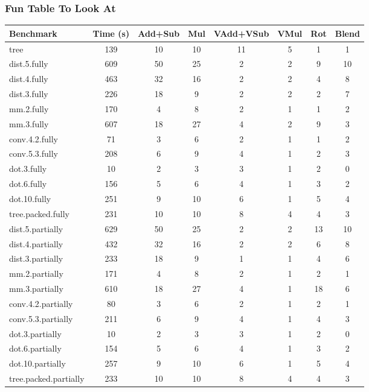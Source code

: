\subsubsection*{Fun Table To Look At}
\begin{table}
    \begin{tabular}{lccccccc}
    \toprule
    Benchmark & Time (s) & Add+Sub & Mul & VAdd+VSub & VMul & Rot & Blend\\\midrule
    tree & 139 & 10 & 10 & 11 & 5 & 1 & 1\\
    dist.5.fully & 609 & 50 & 25 & 2 & 2 & 9 & 10\\
    dist.4.fully & 463 & 32 & 16 & 2 & 2 & 4 & 8\\
    dist.3.fully & 226 & 18 & 9 & 2 & 2 & 2 & 7\\
    mm.2.fully & 170 & 4 & 8 & 2 & 1 & 1 & 2\\
    mm.3.fully & 607 & 18 & 27 & 4 & 2 & 9 & 3\\
    conv.4.2.fully & 71 & 3 & 6 & 2 & 1 & 1 & 2\\
    conv.5.3.fully & 208 & 6 & 9 & 4 & 1 & 2 & 3\\
    dot.3.fully & 10 & 2 & 3 & 3 & 1 & 2 & 0\\
    dot.6.fully & 156 & 5 & 6 & 4 & 1 & 3 & 2\\
    dot.10.fully & 251 & 9 & 10 & 6 & 1 & 5 & 4\\
    tree.packed.fully & 231 & 10 & 10 & 8 & 4 & 4 & 3\\
    dist.5.partially & 629 & 50 & 25 & 2 & 2 & 13 & 10\\
    dist.4.partially & 432 & 32 & 16 & 2 & 2 & 6 & 8\\
    dist.3.partially & 233 & 18 & 9 & 1 & 1 & 4 & 6\\
    mm.2.partially & 171 & 4 & 8 & 2 & 1 & 2 & 1\\
    mm.3.partially & 610 & 18 & 27 & 4 & 1 & 18 & 6\\
    conv.4.2.partially & 80 & 3 & 6 & 2 & 1 & 2 & 1\\
    conv.5.3.partially & 211 & 6 & 9 & 4 & 1 & 4 & 3\\
    dot.3.partially & 10 & 2 & 3 & 3 & 1 & 2 & 0\\
    dot.6.partially & 154 & 5 & 6 & 4 & 1 & 3 & 2\\
    dot.10.partially & 257 & 9 & 10 & 6 & 1 & 5 & 4\\
    tree.packed.partially & 233 & 10 & 10 & 8 & 4 & 4 & 3\\

\end{tabular}
\end{table}

